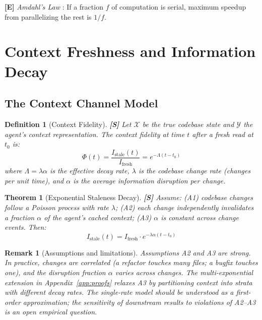 \documentclass[11pt, a4paper, copyright]{googledeepmind}
\newtheorem{definition}{Definition}[section]
\newtheorem{theorem}{Theorem}[section]
\newtheorem*{remark}{Remark}
\begin{document}
\textbf{[E]} \emph{Amdahl's Law} \citep{amdahl1967validity}: If a fraction $f$ of computation is serial, maximum speedup from parallelizing the rest is $1/f$.


\section{Context Freshness and Information Decay}\label{sec:freshness}

\subsection{The Context Channel Model}

\begin{definition}[Context Fidelity]\label{def:fidelity}
\textbf{[S]} Let $\mathcal{X}$ be the true codebase state and $\mathcal{Y}$ the agent's context representation. The \emph{context fidelity} at time $t$ after a fresh read at $t_0$ is:
\[
    \Phi(t) = \frac{I_{\mathrm{stale}}(t)}{I_{\mathrm{fresh}}} = e^{-\Lambda(t - t_0)}
\]
where $\Lambda = \lambda \alpha$ is the effective decay rate, $\lambda$ is the codebase change rate (changes per unit time), and $\alpha$ is the average information disruption per change.
\end{definition}

\begin{theorem}[Exponential Staleness Decay]\label{thm:staleness}
\textbf{[S]} Assume: (A1) codebase changes follow a Poisson process with rate $\lambda$; (A2) each change independently invalidates a fraction $\alpha$ of the agent's cached context; (A3) $\alpha$ is constant across change events. Then:
\[
    I_{\mathrm{stale}}(t) = I_{\mathrm{fresh}} \cdot e^{-\lambda\alpha(t - t_0)}
\]
\end{theorem}

\begin{remark}[Assumptions and limitations]
Assumptions A2 and A3 are strong. In practice, changes are correlated (a refactor touches many files; a bugfix touches one), and the disruption fraction $\alpha$ varies across changes. The multi-exponential extension in Appendix~\ref{app:proofs} relaxes A3 by partitioning context into strata with different decay rates. The single-rate model should be understood as a first-order approximation; the sensitivity of downstream results to violations of A2--A3 is an open empirical question.
\end{remark}
\end{document}

